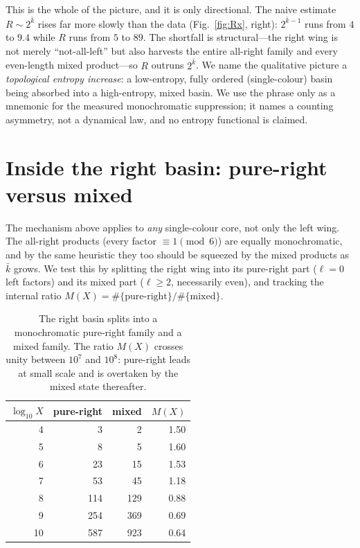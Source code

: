 \documentclass[11pt]{article}
\theoremstyle{plain}
\theoremstyle{definition}
\begin{document}
This is the whole of the picture, and it is only directional. The naive estimate $R\sim2^{\bar k}$
rises far more slowly than the data (Fig.~\ref{fig:Rx}, right): $2^{\bar k-1}$ runs from $4$ to $9.4$
while $R$ runs from $5$ to $89$. The shortfall is structural---the right wing is not merely
``not-all-left'' but also harvests the entire all-right family and every even-length mixed product---so
$R$ outruns $2^{\bar k}$. We name the qualitative picture a \emph{topological entropy increase}: a
low-entropy, fully ordered (single-colour) basin being absorbed into a high-entropy, mixed basin. We
use the phrase only as a mnemonic for the measured monochromatic suppression; it names a counting
asymmetry, not a dynamical law, and no entropy functional is claimed.

\section{Inside the right basin: pure-right versus mixed}
The mechanism above applies to \emph{any} single-colour core, not only the left wing. The all-right
products (every factor $\equiv1\pmod6$) are equally monochromatic, and by the same heuristic they too
should be squeezed by the mixed products as $\bar k$ grows. We test this by splitting the right wing
into its pure-right part ($\ell=0$ left factors) and its mixed part ($\ell\ge2$, necessarily even), and
tracking the internal ratio $M(X)=\#\{\text{pure-right}\}/\#\{\text{mixed}\}$.

\begin{table}[h]
\centering
\begin{tabular}{rrrr}
\toprule
$\log_{10}X$ & pure-right & mixed & $M(X)$\\
\midrule
4  & 3   & 2   & 1.50\\
5  & 8   & 5   & 1.60\\
6  & 23  & 15  & 1.53\\
7  & 53  & 45  & 1.18\\
8  & 114 & 129 & 0.88\\
9  & 254 & 369 & 0.69\\
10 & 587 & 923 & 0.64\\
\bottomrule
\end{tabular}
\caption{The right basin splits into a monochromatic pure-right family and a mixed family. The ratio
$M(X)$ crosses unity between $10^{7}$ and $10^{8}$: pure-right leads at small scale and is overtaken by
the mixed state thereafter.}
\label{tab:Mx}
\end{table}
\end{document}
